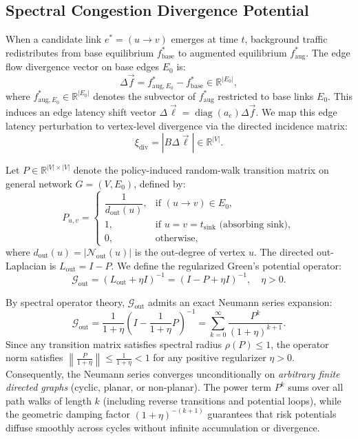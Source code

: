 \documentclass[11pt,a4paper]{article}
\begin{document}
\subsection{Spectral Congestion Divergence Potential}
When a candidate link $e^* = (u \to v)$ emerges at time $t$, background traffic redistributes from base equilibrium $f_{\text{base}}^*$ to augmented equilibrium $f_{\text{aug}}^*$. The edge flow divergence vector on base edges $E_0$ is:
\begin{equation}
\Delta \vec{f} = f_{\text{aug}, E_0}^* - f_{\text{base}}^* \in \mathbb{R}^{|E_0|},
\end{equation}
where $f_{\text{aug}, E_0}^* \in \mathbb{R}^{|E_0|}$ denotes the subvector of $f_{\text{aug}}^*$ restricted to base links $E_0$. This induces an edge latency shift vector $\Delta \vec{\ell} = \operatorname{diag}(a_e) \Delta \vec{f}$. We map this edge latency perturbation to vertex-level divergence via the directed incidence matrix:
\begin{equation}
\xi_{\text{div}} = |B \Delta \vec{\ell}| \in \mathbb{R}^{|V|}.
\end{equation}

Let $P \in \mathbb{R}^{|V| \times |V|}$ denote the policy-induced random-walk transition matrix on general network $G = (V, E_0)$, defined by:
\begin{equation}
P_{u, v} = 
\begin{cases}
\dfrac{1}{d_{\text{out}}(u)}, & \text{if } (u \to v) \in E_0, \\
1, & \text{if } u = v = t_{\text{sink}} \text{ (absorbing sink)}, \\
0, & \text{otherwise},
\end{cases}
\end{equation}
where $d_{\text{out}}(u) = |\mathcal{N}_{\text{out}}(u)|$ is the out-degree of vertex $u$. The directed out-Laplacian is $L_{\text{out}} = I - P$. We define the regularized Green's potential operator:
\begin{equation}
\mathcal{G}_{\text{out}} = (L_{\text{out}} + \eta I)^{-1} = (I - P + \eta I)^{-1}, \quad \eta > 0.
\end{equation}

By spectral operator theory, $\mathcal{G}_{\text{out}}$ admits an exact Neumann series expansion:
\begin{equation}
\label{eq:neumann_series}
\mathcal{G}_{\text{out}} = \frac{1}{1 + \eta} \left( I - \frac{1}{1 + \eta} P \right)^{-1} = \sum_{k=0}^{\infty} \frac{P^k}{(1 + \eta)^{k+1}}.
\end{equation}
Since any transition matrix satisfies spectral radius $\rho(P) \le 1$, the operator norm satisfies $\left\| \frac{P}{1 + \eta} \right\| \le \frac{1}{1 + \eta} < 1$ for any positive regularizer $\eta > 0$. Consequently, the Neumann series converges unconditionally on \textit{arbitrary finite directed graphs} (cyclic, planar, or non-planar). The power term $P^k$ sums over all path walks of length $k$ (including reverse transitions and potential loops), while the geometric damping factor $(1 + \eta)^{-(k+1)}$ guarantees that risk potentials diffuse smoothly across cycles without infinite accumulation or divergence.
\end{document}
